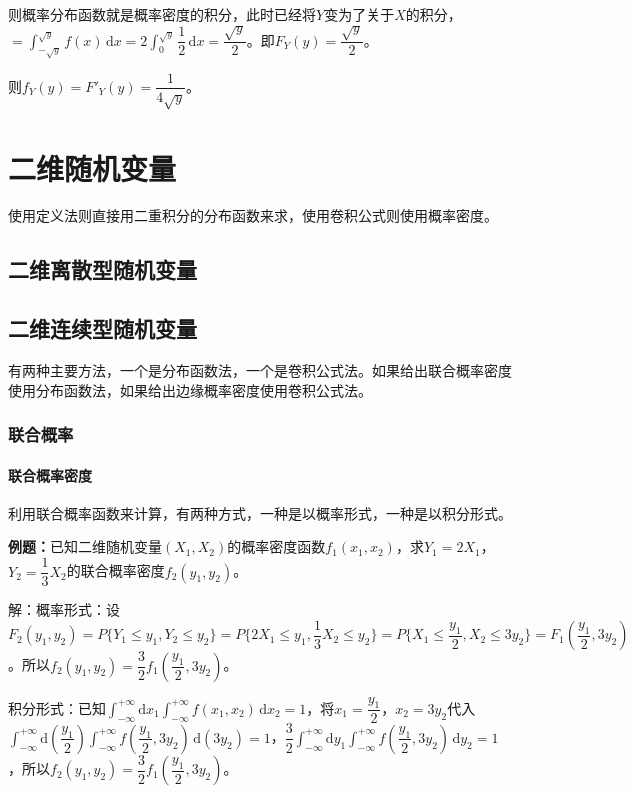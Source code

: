 则概率分布函数就是概率密度的积分，此时已经将$Y$变为了关于$X$的积分，$=\int_{-\sqrt{y}}^{\sqrt{y}}f(x)\,\textrm{d}x=$$\displaystyle{2\int_0^{\sqrt{y}}\dfrac{1}{2}\,\textrm{d}x}=\dfrac{\sqrt{y}}{2}$。即$F_Y(y)=\dfrac{\sqrt{y}}{2}$。

则$f_Y(y)=F'_Y(y)=\dfrac{1}{4\sqrt{y}}$。

\section{二维随机变量}

使用定义法则直接用二重积分的分布函数来求，使用卷积公式则使用概率密度。

\subsection{二维离散型随机变量}

\subsection{二维连续型随机变量}

有两种主要方法，一个是分布函数法，一个是卷积公式法。如果给出联合概率密度使用分布函数法，如果给出边缘概率密度使用卷积公式法。

\subsubsection{联合概率}

\paragraph{联合概率密度} \leavevmode \medskip

利用联合概率函数来计算，有两种方式，一种是以概率形式，一种是以积分形式。

\textbf{例题：}已知二维随机变量$(X_1,X_2)$的概率密度函数$f_1(x_1,x_2)$，求$Y_1=2X_1$，$Y_2=\dfrac{1}{3}X_2$的联合概率密度$f_2(y_1,y_2)$。

解：概率形式：设$F_2(y_1,y_2)=P\{Y_1\leqslant y_1,Y_2\leqslant y_2\}=P\{2X_1\leqslant y_1,\dfrac{1}{3}X_2\leqslant y_2\}=P\{X_1\leqslant\dfrac{y_1}{2},X_2\leqslant3y_2\}=F_1(\dfrac{y_1}{2},3y_2)$。所以$f_2(y_1,y_2)=\dfrac{3}{2}f_1(\dfrac{y_1}{2},3y_2)$。

积分形式：已知$\int_{-\infty}^{+\infty}\textrm{d}x_1\int_{-\infty}^{+\infty}f(x_1,x_2)\,\textrm{d}x_2=1$，将$x_1=\dfrac{y_1}{2}$，$x_2=3y_2$代入$\int_{-\infty}^{+\infty}\textrm{d}(\dfrac{y_1}{2})\int_{-\infty}^{+\infty}f(\dfrac{y_1}{2},3y_2)\,\textrm{d}(3y_2)=1$，$\dfrac{3}{2}\int_{-\infty}^{+\infty}\textrm{d}y_1\int_{-\infty}^{+\infty}f(\dfrac{y_1}{2},3y_2)\,\textrm{d}y_2=1$，所以$f_2(y_1,y_2)=\dfrac{3}{2}f_1(\dfrac{y_1}{2},3y_2)$。

